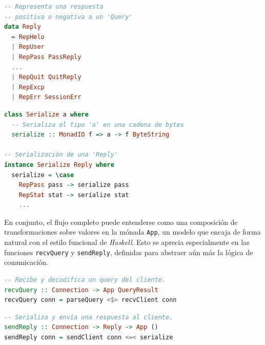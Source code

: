 \documentclass[a4paper]{CSMakotoTechnicalReport}
\begin{document}
\vspace{-24pt}
\begin{minipage}[t]{0.40\textwidth}
\begin{lstlisting}[language=Haskell, frame=none, numbers=none, basicstyle=\footnotesize]
-- Representa una respuesta
-- positiva o negativa a un 'Query'
data Reply
  = RepHelo
  | RepUser
  | RepPass PassReply
  ...
  | RepQuit QuitReply
  | RepExcp
  | RepErr SessionErr
\end{lstlisting}
\vspace{-4pt}
\captionsetup{type=lstlisting}
\caption{Definición de Reply.}
\end{minipage}
\hfill
\begin{minipage}[t]{0.55\textwidth}
\begin{lstlisting}[language=Haskell, frame=none, numbers=none, basicstyle=\footnotesize]
class Serialize a where
  -- Serializa el tipo 'a' en una cadena de bytes
  serialize :: MonadIO f => a -> f ByteString

-- Serialización de una 'Reply'
instance Serialize Reply where
  serialize = \case
    RepPass pass -> serialize pass
    RepStat stat -> serialize stat
    ...
\end{lstlisting}
\vspace{-4pt}
\captionsetup{type=lstlisting}
\caption{Clase Serialize e instancia de Reply.}
\end{minipage}
\vspace{2pt}

En conjunto, el flujo completo puede entenderse como una composición de transformaciones sobre valores en la mónada \texttt{App}, un modelo que encaja de forma natural con el estilo funcional de \textit{Haskell}. Esto se aprecia especialmente en las funciones \texttt{recvQuery} y \texttt{sendReply}, definidas para abstraer aún más la lógica de comunicación.

\vspace{-24pt}
\begin{minipage}[t]{0.47\textwidth}
\begin{lstlisting}[language=Haskell, frame=none, numbers=none, basicstyle=\footnotesize]
-- Recibe y decodifica un query del cliente.
recvQuery :: Connection -> App QueryResult
recvQuery conn = parseQuery <$> recvClient conn
\end{lstlisting}
\vspace{-4pt}
\captionsetup{type=lstlisting}
\caption{Definición de recvQuery.}
\end{minipage}
\hfill
\begin{minipage}[t]{0.52\textwidth}
\begin{lstlisting}[language=Haskell, frame=none, numbers=none, basicstyle=\footnotesize]
-- Serializa y envía una respuesta al cliente.
sendReply :: Connection -> Reply -> App ()
sendReply conn = sendClient conn <=< serialize
\end{lstlisting}
\vspace{-4pt}
\captionsetup{type=lstlisting}
\caption{Definición de sendReply.}
\end{minipage}
\vspace{5pt}
\end{document}
